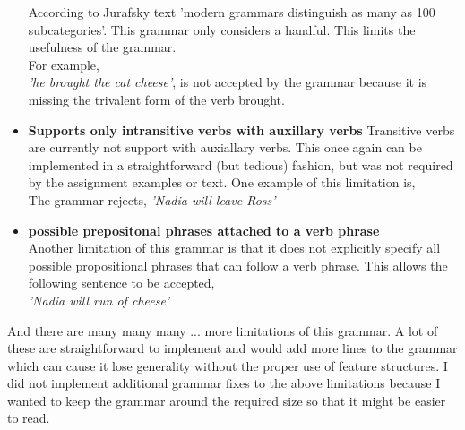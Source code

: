 \documentclass{article}
\begin{document}
\begin{itemize}
\small According to Jurafsky text 'modern grammars distinguish as many as 100 subcategories'. This grammar only considers a handful. This limits the usefulness of the grammar. \\
For example,\\ \textit{'he brought the cat cheese'}, is not accepted by the grammar because it is missing the trivalent form of the verb brought. \normalsize
\item \textbf{Supports only intransitive verbs with auxillary verbs}
Transitive verbs are currently not support with auxiallary verbs. This once again can be implemented in a straightforward (but tedious) fashion, but was not required by the assignment examples or text. One example of this limitation is,\\
The grammar rejects, \textit{'Nadia will leave Ross'}
\item \textbf{possible prepositonal phrases attached to a verb phrase}\\
Another limitation of this grammar is that it does not explicitly specify all possible propositional phrases that can follow a verb phrase. This allows the following sentence to be accepted,\\
\textit{'Nadia will run of cheese'}
\end{itemize}
And there are many \small many \tiny many ... \normalsize more limitations of this grammar. A lot of these are straightforward to implement and would add more lines to the grammar which can cause it lose generality without the proper use of feature structures. I did not implement additional grammar fixes to the above limitations because I wanted to keep the grammar around the required size so that it might be easier to read.

\newpage
\end{document}
